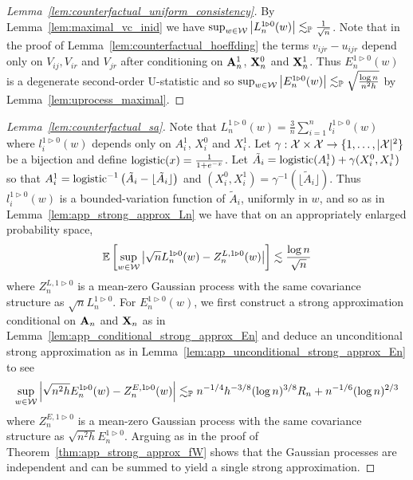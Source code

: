 \begin{proof}[Lemma~\ref{lem:counterfactual_uniform_consistency}]

  By Lemma~\ref{lem:maximal_vc_inid} we have
  $\sup_{w \in \mathcal{W}} \big|L_n^{1 \triangleright 0}(w)\big|
  \lesssim_{\mathbb{P}} \frac{1}{\sqrt n}$.
  Note that in the proof of Lemma~\ref{lem:counterfactual_hoeffding}
  the terms $v_{ijr} - u_{ijr}$ depend only on $V_{ij}, V_{ir}$ and $V_{jr}$
  after conditioning on $\mathbf{A}_n^1$, $\mathbf{X}_n^0$ and $\mathbf{X}_n^1$.
  Thus $E_n^{1 \triangleright 0}(w)$ is a degenerate second-order
  U-statistic and so
  $\sup_{w \in \mathcal{W}} \big|E_n^{1 \triangleright 0}(w)\big|
  \lesssim_{\mathbb{P}} \sqrt{\frac{\log n}{n^2h}}$
  by Lemma~\ref{lem:uprocess_maximal}.
\end{proof}

\begin{proof}[Lemma~\ref{lem:counterfactual_sa}]

  Note that
  $L_n^{1 \triangleright 0}(w)
  = \frac 3n \sum_{i=1}^n l_i^{1 \triangleright 0}(w)$
  where $l_i^{1 \triangleright 0}(w)$ depends only on
  $A_i^1$, $X_i^0$ and $X_i^1$.
  Let $\gamma: \mathcal{X} \times \mathcal{X} \to \{1, \ldots, |\mathcal{X}|^2\}$
  be a bijection and
  define $\operatorname*{logistic}(x) = \frac{1}{1+e^{-x}}$.
  Let
  $\tilde A_i = \operatorname*{logistic}(A_i^1) + \gamma(X_i^0, X_i^1)$
  so that
  $A_i^1 = \operatorname*{logistic}^{-1}\big(\tilde A_i
  - \lfloor \tilde A_i \rfloor\big)$
  and
  $(X_i^0, X_i^1) = \gamma^{-1}(\lfloor \tilde A_i \rfloor)$.
  Thus
  $l_i^{1 \triangleright 0}(w)$ is a bounded-variation function
  of $\tilde A_i$, uniformly in $w$, and so as in
  Lemma~\ref{lem:app_strong_approx_Ln} we have that
  on an appropriately enlarged probability space,
  \begin{align*}
    \mathbb{E}\left[
      \sup_{w \in \mathcal{W}}
      \left|
      \sqrt n L_n^{1 \triangleright 0}(w)
      - Z_n^{L, 1 \triangleright 0}(w)
      \right|
    \right]
    \lesssim
    \frac{\log n}{\sqrt n}
  \end{align*}
  where $Z_n^{L, 1 \triangleright 0}$ is a mean-zero
  Gaussian process with the same covariance structure as
  $\sqrt n L_n^{1 \triangleright 0}$.
  For $E_n^{1 \triangleright 0}(w)$,
  we first construct a strong approximation conditional on
  $\mathbf{A}_n$ and $\mathbf{X}_n$ as in Lemma~\ref{lem:app_conditional_strong_approx_En}
  and deduce an unconditional strong approximation as in
  Lemma~\ref{lem:app_unconditional_strong_approx_En} to see
  \begin{align*}
    \sup_{w \in \mathcal{W}}
    \left|
    \sqrt{n^2h} E_n^{1 \triangleright 0}(w)
    - Z_n^{E, 1 \triangleright 0}(w)
    \right|
    \lesssim_{\mathbb{P}}
    n^{-1/4} h^{-3/8} (\log n)^{3/8} R_n
    + n^{-1/6} (\log n)^{2/3}
  \end{align*}
  where $Z_n^{E, 1 \triangleright 0}$ is a mean-zero
  Gaussian process with the same covariance structure as
  $\sqrt{n^2h} E_n^{1 \triangleright 0}$.
  Arguing as in the proof of Theorem~\ref{thm:app_strong_approx_fW}
  shows that the Gaussian processes are independent
  and can be summed to yield a single strong approximation.
\end{proof}

